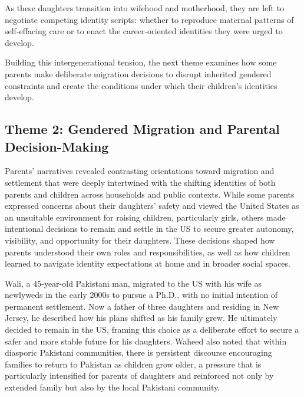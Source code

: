 As these daughters transition into wifehood and motherhood, they are left to negotiate competing identity scripts: whether to reproduce maternal patterns of self-effacing care or to enact the career-oriented identities they were urged to develop. 

Building this intergenerational tension, the next theme examines how some parents make deliberate migration decisions to disrupt inherited gendered constraints and create the conditions under which their children’s identities develop.

\subsection{Theme 2: Gendered Migration and Parental Decision-Making}

Parents’ narratives revealed contrasting orientations toward migration and settlement that were deeply intertwined with the shifting identities of both parents and children across households and public contexts. While some parents expressed concerns about their daughters’ safety and viewed the United States as an unsuitable environment for raising children, particularly girls, others made intentional decisions to remain and settle in the US to secure greater autonomy, visibility, and opportunity for their daughters. These decisions shaped how parents understood their own roles and responsibilities, as well as how children learned to navigate identity expectations at home and in broader social spaces.

Wali, a 45-year-old Pakistani man, migrated to the US with his wife as newlyweds in the early 2000s to pursue a Ph.D., with no initial intention of permanent settlement. Now a father of three daughters and residing in New Jersey, he described how his plans shifted as his family grew. He ultimately decided to remain in the US, framing this choice as a deliberate effort to secure a safer and more stable future for his daughters. Waheed also noted that within diasporic Pakistani communities, there is persistent discourse encouraging families to return to Pakistan as children grow older, a pressure that is particularly intensified for parents of daughters and reinforced not only by extended family but also by the local Pakistani community.

